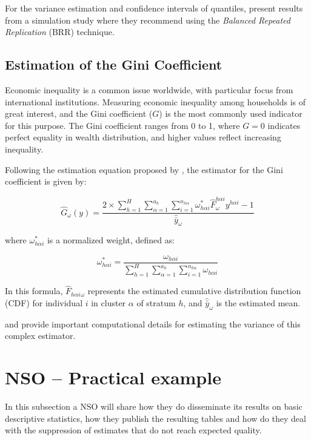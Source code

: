 \documentclass[
  12pt,
]{book}
\begin{document}
For the variance estimation and confidence intervals of quantiles, \citet{kovar1988bootstrap} present results from a simulation study where they recommend using the \emph{Balanced Repeated Replication} (BRR) technique.

\subsection{Estimation of the Gini Coefficient}\label{estimation-of-the-gini-coefficient}

Economic inequality is a common issue worldwide, with particular focus from international institutions. Measuring economic inequality among households is of great interest, and the Gini coefficient (\(G\)) is the most commonly used indicator for this purpose. The Gini coefficient ranges from 0 to 1, where \(G = 0\) indicates perfect equality in wealth distribution, and higher values reflect increasing inequality.

Following the estimation equation proposed by \citet{binder1995estimating}, the estimator for the Gini coefficient is given by:

\[
\widehat{G}_{\omega}\left(y\right) = \frac{2 \times \sum_{h=1}^{H}\sum_{\alpha=1}^{a_{h}}\sum_{i=1}^{n_{h\alpha}}\omega_{h\alpha i}^{*}\hat{F}_{\omega}^{h\alpha i}y^{h\alpha i}-1}{\hat{\bar{y}}_{\omega}}
\]

where \(\omega_{h\alpha i}^{*}\) is a normalized weight, defined as:

\[
\omega_{h\alpha i}^{*} = \frac{\omega_{h\alpha i}}{\sum_{h=1}^{H}\sum_{\alpha=1}^{a_{h}}\sum_{i=1}^{n_{h\alpha}}\omega_{h\alpha i}}
\]

In this formula, \(\hat{F}_{h\alpha i}{}_{\omega}\) represents the estimated cumulative distribution function (CDF) for individual \(i\) in cluster \(\alpha\) of stratum \(h\), and \(\hat{\bar{y}}_{\omega}\) is the estimated mean.

\citet{osier2009variance} and \citet{Langel_Tille_2013} provide important computational details for estimating the variance of this complex estimator.

\section{NSO -- Practical example}\label{nso-practical-example}

In this subsection a NSO will share how they do disseminate its results on basic descriptive statistics, how they publish the resulting tables and how do they deal with the suppression of estimates that do not reach expected quality.
\end{document}
